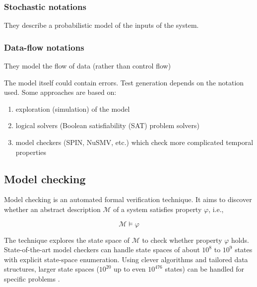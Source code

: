 \subsubsection{Stochastic notations}

They describe a probabilistic model of the inputs of the system.

\subsubsection{Data-flow notations}

They model the flow of data (rather than control flow)

The model itself could contain errors. Test generation depends on the notation used. Some approaches are based on:

\begin{enumerate}
    \item exploration (simulation) of the model
    \item logical solvers (Boolean satisfiability (SAT) problem solvers)
    \item model checkers (SPIN, NuSMV, etc.) which check more complicated temporal properties
\end{enumerate}

\subsection{Model checking}

Model checking is an automated formal verification technique. It aims to discover whether an abstract description $\mathcal{M}$ of a system satisfies property $\varphi$, i.e.,

\begin{equation}
    \mathcal{M} \models \varphi
\end{equation}

The technique explores the state space of $\mathcal{M}$ to check whether property $\varphi$ holds. State-of-the-art model checkers can handle state spaces of about $10^8$ to $10^9$ states with explicit state-space enumeration. Using clever algorithms and tailored data structures, larger state spaces ($10^{20}$ up to even $10^{476}$ states) can be handled for specific problems \cite{Baier:ModelChecking}.

